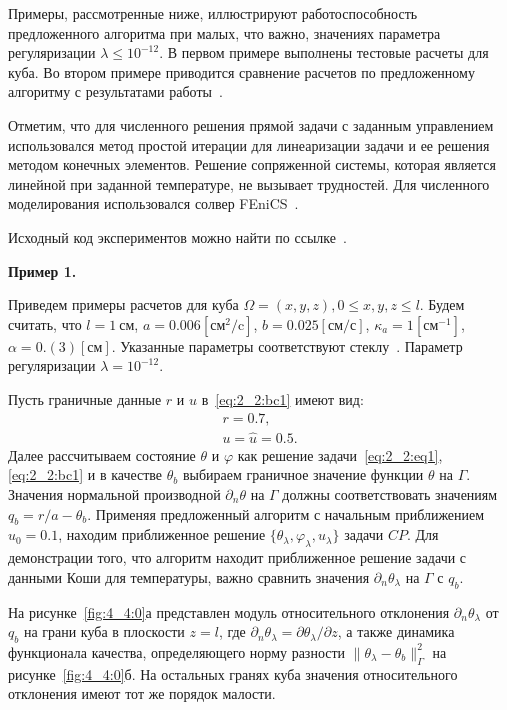 Примеры, рассмотренные ниже, иллюстрируют работоспособность предложенного алгоритма при
малых, что важно, значениях параметра регуляризации $\lambda \leq 10^{-12}$.
В первом примере выполнены тестовые расчеты для куба.
Во втором примере приводится сравнение расчетов по
предложенному алгоритму с результатами работы~\cite{Chebotarev2019Problem}.

Отметим, что для численного решения прямой задачи с заданным управлением использовался
метод простой итерации для линеаризации задачи и ее решения методом конечных элементов.
Решение сопряженной системы, которая является линейной при заданной температуре,
не вызывает трудностей.
Для численного моделирования использовался солвер FEniCS~\cite{fenics, dolfin}.

Исходный код экспериментов можно найти по ссылке~\cite{mesenev-github}.

\textbf{Пример 1.}

Приведем примеры расчетов для куба $\Omega = {(x, y, z), 0 \leq x,y,z \leq l}$.
Будем считать, что $l=1~\text{см}$, $a = 0.006[\text{см}^2/\text{c}]$,
$b=0.025[\text{см}/\text{с}]$, $\kappa_a=1[\text{см}^{-1}]$, $\alpha = 0.(3)[\text{см}]$.
Указанные параметры соответствуют стеклу~\cite{Grenkin2016a}.
Параметр регуляризации $\lambda=10^{-12}.$

Пусть граничные данные $r$ и $u$ в~\eqref{eq:2_2:bc1} имеют вид:
\begin{gather*}
    r = 0.7,\\
    u = \hat u = 0.5.
\end{gather*}
Далее рассчитываем состояние $\theta$ и $\varphi$ как решение
задачи~\eqref{eq:2_2:eq1},\eqref{eq:2_2:bc1} и в качестве $\theta_b$
выбираем граничное значение функции $\theta$ на $\Gamma$.
Значения нормальной производной $\partial_n\theta$ на $\Gamma$
должны соответствовать значениям $q_b=r/a-\theta_b$.
Применяя предложенный алгоритм с начальным приближением $u_0 = 0.1$,
находим приближенное решение $\{\theta_\lambda, \varphi_\lambda, u_\lambda\}$ задачи $CP$.
Для демонстрации того, что алгоритм находит приближенное решение задачи с данными
Коши для температуры, важно сравнить значения $\partial_n\theta_\lambda$ на $\Gamma$ с $q_b.$

На рисунке~\ref{fig:4_4:0}а представлен модуль относительного
отклонения $\partial_n\theta_\lambda$ от $q_b$ на грани куба в плоскости $z=l$,
где $\partial_n\theta_\lambda=\partial\theta_\lambda/\partial z$,
а также динамика функционала качества, определяющего норму
разности $\|\theta_\lambda -\theta_b\|^2_\Gamma$ на рисунке~\ref{fig:4_4:0}б.
На остальных гранях куба значения относительного
отклонения имеют тот же порядок малости.

